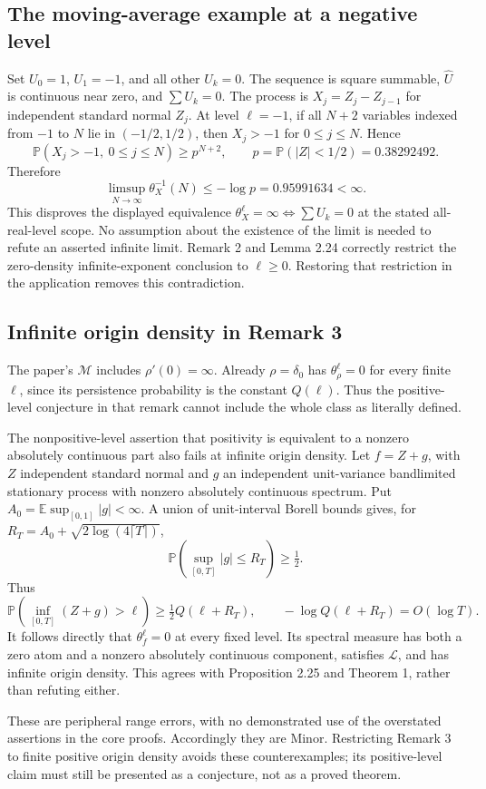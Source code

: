 \documentclass[10pt]{article}
\begin{document}
\subsection*{The moving-average example at a negative level}
Set \(U_0=1\), \(U_1=-1\), and all other \(U_k=0\). The sequence is square summable, \(\widehat U\) is continuous near zero, and \(\sum U_k=0\). The process is \(X_j=Z_j-Z_{j-1}\) for independent standard normal \(Z_j\). At level \(\ell=-1\), if all \(N+2\) variables indexed from \(-1\) to \(N\) lie in \((-1/2,1/2)\), then \(X_j>-1\) for \(0\le j\le N\). Hence \[\mathbb P(X_j>-1,\ 0\le j\le N)\ge p^{N+2},\qquad
 p=\mathbb P(|Z|<1/2)=0.38292492.\] Therefore \[\limsup_{N\to\infty}\theta_X^{-1}(N)
       \le-\log p=0.95991634<\infty.\] This disproves the displayed equivalence \(\theta_X^\ell=\infty\Longleftrightarrow\sum U_k=0\) at the stated all-real-level scope. No assumption about the existence of the limit is needed to refute an asserted infinite limit. Remark 2 and Lemma 2.24 correctly restrict the zero-density infinite-exponent conclusion to \(\ell\ge0\). Restoring that restriction in the application removes this contradiction.\par
\subsection*{Infinite origin density in Remark 3}
The paper’s \(\mathcal M\) includes \(\rho'(0)=\infty\). Already \(\rho=\delta_0\) has \(\theta_\rho^\ell=0\) for every finite \(\ell\), since its persistence probability is the constant \(Q(\ell)\). Thus the positive-level conjecture in that remark cannot include the whole class as literally defined.\par
The nonpositive-level assertion that positivity is equivalent to a nonzero absolutely continuous part also fails at infinite origin density. Let \(f=Z+g\), with \(Z\) independent standard normal and \(g\) an independent unit-variance bandlimited stationary process with nonzero absolutely continuous spectrum. Put \(A_0=\mathbb E\sup_{[0,1]}|g|<\infty\). A union of unit-interval Borell bounds gives, for \(R_T=A_0+\sqrt{2\log(4\lceil T\rceil)}\), \[\mathbb P(\sup_{[0,T]}|g|\le R_T)\ge\tfrac12.\] Thus \[\mathbb P(\inf_{[0,T]}(Z+g)>\ell)\ge\tfrac12 Q(\ell+R_T),
 \qquad -\log Q(\ell+R_T)=O(\log T).\] It follows directly that \(\theta_f^\ell=0\) at every fixed level. Its spectral measure has both a zero atom and a nonzero absolutely continuous component, satisfies \(\mathcal L\), and has infinite origin density. This agrees with Proposition 2.25 and Theorem 1, rather than refuting either.\par
These are peripheral range errors, with no demonstrated use of the overstated assertions in the core proofs. Accordingly they are Minor. Restricting Remark 3 to finite positive origin density avoids these counterexamples; its positive-level claim must still be presented as a conjecture, not as a proved theorem.\par
\end{document}
